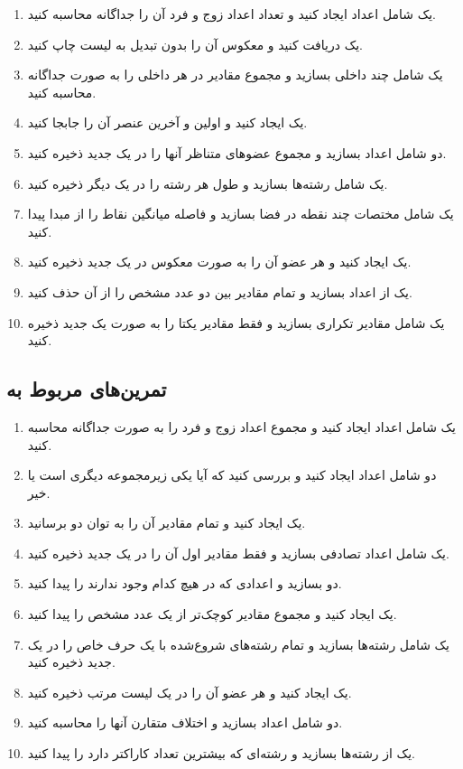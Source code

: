 \documentclass[a4paper,12pt]{article}
\begin{document}
	\begin{enumerate}
		\item یک  شامل اعداد ایجاد کنید و تعداد اعداد زوج و فرد آن را جداگانه محاسبه کنید.
		\item یک  دریافت کنید و معکوس آن را بدون تبدیل به لیست چاپ کنید.
		\item یک  شامل چند  داخلی بسازید و مجموع مقادیر در هر  داخلی را به صورت جداگانه محاسبه کنید.
		\item یک  ایجاد کنید و اولین و آخرین عنصر آن را جابجا کنید.
		\item دو  شامل اعداد بسازید و مجموع عضوهای متناظر آنها را در یک  جدید ذخیره کنید.
		\item یک  شامل رشته‌ها بسازید و طول هر رشته را در یک  دیگر ذخیره کنید.
		\item یک  شامل مختصات چند نقطه در فضا بسازید و فاصله میانگین نقاط را از مبدا پیدا کنید.
		\item یک  ایجاد کنید و هر عضو آن را به صورت معکوس در یک  جدید ذخیره کنید.
		\item یک  از اعداد بسازید و تمام مقادیر بین دو عدد مشخص را از آن حذف کنید.
		\item یک  شامل مقادیر تکراری بسازید و فقط مقادیر یکتا را به صورت یک  جدید ذخیره کنید.
	\end{enumerate}
	
	\subsection*{تمرین‌های مربوط به }
	
	\begin{enumerate}
		\item یک  شامل اعداد ایجاد کنید و مجموع اعداد زوج و فرد را به صورت جداگانه محاسبه کنید.
		\item دو  شامل اعداد ایجاد کنید و بررسی کنید که آیا یکی زیرمجموعه دیگری است یا خیر.
		\item یک  ایجاد کنید و تمام مقادیر آن را به توان دو برسانید.
		\item یک  شامل اعداد تصادفی بسازید و فقط مقادیر اول آن را در یک  جدید ذخیره کنید.
		\item دو  بسازید و اعدادی که در هیچ کدام وجود ندارند را پیدا کنید.
		\item یک  ایجاد کنید و مجموع مقادیر کوچک‌تر از یک عدد مشخص را پیدا کنید.
		\item یک  شامل رشته‌ها بسازید و تمام رشته‌های شروع‌شده با یک حرف خاص را در یک  جدید ذخیره کنید.
		\item یک  ایجاد کنید و هر عضو آن را در یک لیست مرتب ذخیره کنید.
		\item دو  شامل اعداد بسازید و اختلاف متقارن آنها را محاسبه کنید.
		\item یک  از رشته‌ها بسازید و رشته‌ای که بیشترین تعداد کاراکتر دارد را پیدا کنید.
	\end{enumerate}
	
\end{document}
